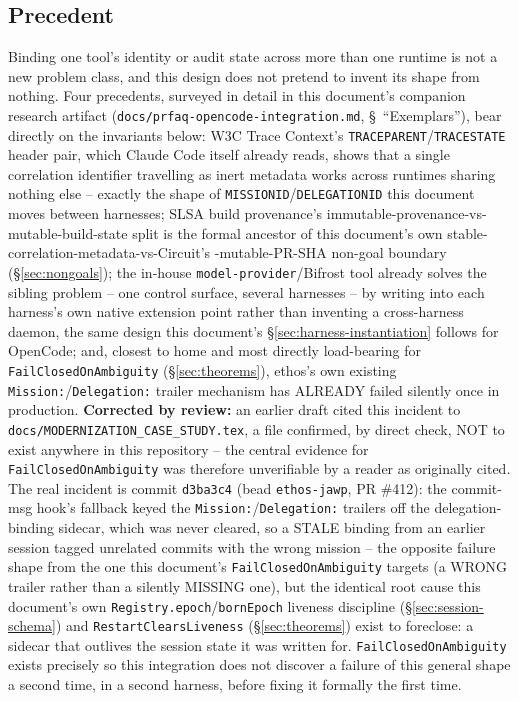 \documentclass[a4paper,10pt,fleqn]{article}
\newcommand{\fpath}[1]{\texttt{#1}}
\newcommand{\field}[1]{\texttt{#1}}
\begin{document}
\subsection{Precedent}
\label{sec:precedent}

Binding one tool's identity or audit state across more than one
runtime is not a new problem class, and this design does not pretend
to invent its shape from nothing. Four precedents, surveyed in detail
in this document's companion research artifact
(\fpath{docs/prfaq-opencode-integration.md}, \S~``Exemplars''), bear
directly on the invariants below: W3C Trace Context's
\field{TRACEPARENT}/\field{TRACESTATE} header pair, which Claude Code
itself already reads, shows that a single correlation identifier
travelling as inert metadata works across runtimes sharing nothing
else -- exactly the shape of \field{MISSIONID}/\field{DELEGATIONID}
this document moves between harnesses; SLSA build provenance's
immutable-provenance-vs-mutable-build-state split is the formal
ancestor of this document's own stable-correlation-metadata-vs-Circuit's
-mutable-PR-SHA non-goal boundary (\S\ref{sec:nongoals}); the in-house
\field{model-provider}/Bifrost tool already solves the sibling
problem -- one control surface, several harnesses -- by writing into
each harness's own native extension point rather than inventing a
cross-harness daemon, the same design this document's
\S\ref{sec:harness-instantiation} follows for OpenCode; and, closest
to home and most directly load-bearing for
\field{FailClosedOnAmbiguity} (\S\ref{sec:theorems}), ethos's own
existing \field{Mission:}/\field{Delegation:} trailer mechanism has
ALREADY failed silently once in production. \textbf{Corrected by
review:} an earlier draft cited this incident to
\fpath{docs/MODERNIZATION\_CASE\_STUDY.tex}, a file confirmed, by direct
check, NOT to exist anywhere in this repository -- the central
evidence for \field{FailClosedOnAmbiguity} was therefore unverifiable
by a reader as originally cited. The real incident is commit
\field{d3ba3c4} (bead \field{ethos-jawp}, PR \#412): the commit-msg
hook's fallback keyed the \field{Mission:}/\field{Delegation:} trailers
off the delegation-binding sidecar, which was never cleared, so a
STALE binding from an earlier session tagged unrelated commits with the
wrong mission -- the opposite failure shape from the one this
document's \field{FailClosedOnAmbiguity} targets (a WRONG trailer
rather than a silently MISSING one), but the identical root cause this
document's own \field{Registry.epoch}/\field{bornEpoch} liveness
discipline (\S\ref{sec:session-schema}) and \field{RestartClearsLiveness}
(\S\ref{sec:theorems}) exist to foreclose: a sidecar that outlives the
session state it was written for. \field{FailClosedOnAmbiguity} exists
precisely so this integration does not discover a failure of this
general shape a second time, in a second harness, before fixing it
formally the first time.
\end{document}

